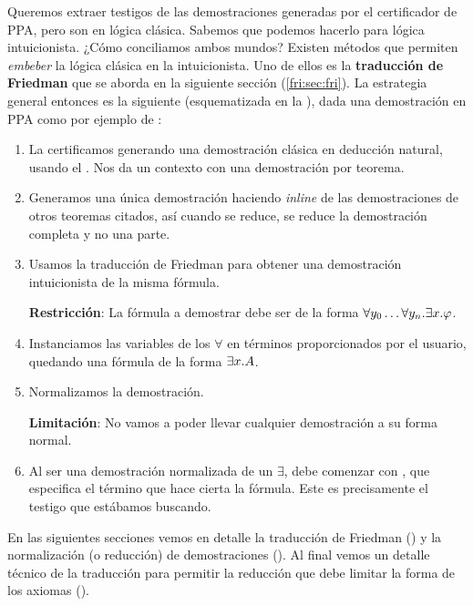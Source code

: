 Queremos extraer testigos de las demostraciones generadas por el certificador de
PPA, pero son en lógica clásica. Sabemos que podemos hacerlo para lógica
intuicionista. ¿Cómo conciliamos ambos mundos? Existen métodos que permiten
\textit{embeber} la lógica clásica en la intuicionista. Uno de ellos es la
\textbf{traducción de Friedman} que se aborda en la siguiente sección (\ref{fri:sec:fri}). La
estrategia general entonces es la siguiente (esquematizada en la ), dada una demostración en PPA como
por ejemplo de :
\begin{enumerate}
    \item La certificamos generando una demostración clásica en deducción
          natural, usando el \modCertifier{}. Nos da un contexto con una demostración
          por teorema.
    \item Generamos una única demostración haciendo \textit{inline} de las demostraciones de otros teoremas citados, así cuando se reduce, se reduce la demostración completa y no una parte.
    \item Usamos la traducción de Friedman para obtener una demostración
          intuicionista de la misma fórmula.

          \textbf{Restricción}: La fórmula a demostrar debe ser de la forma
          $\forall y_0 \dots \forall y_n . \exists x . \varphi$.
    \item Instanciamos las variables de los $\forall$ en términos proporcionados
          por el usuario, quedando una fórmula de la forma $\exists x . A$.
    \item Normalizamos la demostración.

          \textbf{Limitación}: No vamos a poder llevar cualquier demostración a
          su forma normal.

    \item Al ser una demostración normalizada de un $\exists$, debe comenzar con
          , que especifica el término que hace cierta la fórmula. Este
          es precisamente el testigo que estábamos buscando.
          \proofTreeExistsI
\end{enumerate}

En las siguientes secciones vemos en detalle la traducción de Friedman
() y la normalización (o reducción) de demostraciones (). Al final vemos un detalle técnico de la traducción para permitir la reducción que debe limitar la forma de los axiomas ().

